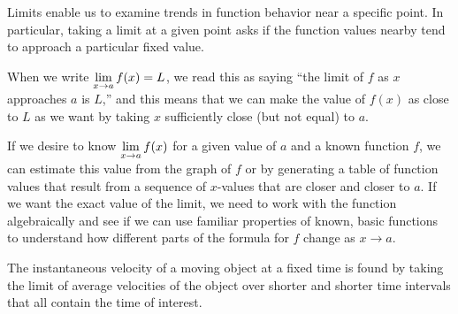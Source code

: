 \begin{summary}
\item Limits enable us to examine trends in function behavior near a specific point.  In particular, taking a limit at a given point asks if the function values nearby tend to approach a particular fixed value.
\item When we write $\displaystyle \lim_{x \to a} f(x) = L$, we read this as saying ``the limit of $f$ as $x$ approaches $a$ is $L$,'' and this means that we can make the value of $f(x)$ as close to $L$ as we want by taking $x$ sufficiently close (but not equal) to $a$.
\item If we desire to know $\displaystyle \lim_{x \to a} f(x)$ for a given value of $a$ and a known function $f$, we can estimate this value from the graph of $f$ or by generating a table of function values that result from a sequence of $x$-values that are closer and closer to $a$.  If we want the exact value of the limit, we need to work with the function algebraically and see if we can use familiar properties of known, basic functions to understand how different parts of the formula for $f$ change as $x \to a$. 
\item The instantaneous velocity of a moving object at a fixed time is found by taking the limit of average velocities of the object over shorter and shorter time intervals that all contain the time of interest.
\end{summary}

\nin \hrulefill

 

\clearpage

